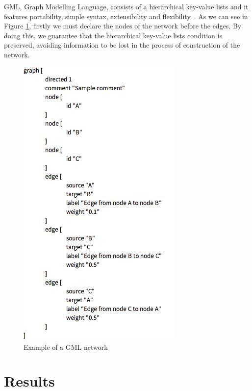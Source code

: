 \documentclass[12pt]{article}
\begin{document}
\begin{enumerate}
GML, Graph Modelling Language, consists of a hierarchical key-value lists and it features portability, simple syntax, extensibility and flexibility~\cite{gml}. As we can see in Figure \ref{fig:gml}, firstly we must declare the nodes of the network before the edges. By doing this, we guarantee that the hierarchical key-value lists condition is preserved, avoiding information to be lost in the process of  construction of the network.
\begin{figure}[H]
	\centering
	\includegraphics[scale=1]{gml.png}
	\caption{Example of a GML network}
	\label{fig:gml}
\end{figure}
\end{enumerate}
\newpage
\section{Results}\label{results}



\pagebreak


\end{document}

